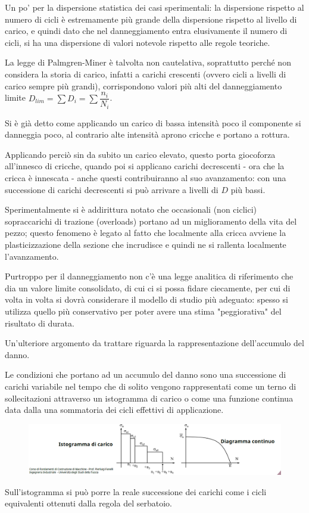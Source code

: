 			 Un po' per la dispersione statistica dei casi sperimentali: la dispersione rispetto al numero di cicli è estremamente più grande della dispersione rispetto al livello di carico, e quindi dato che nel danneggiamento entra elusivamente il numero di cicli, si ha una dispersione di valori notevole rispetto alle regole teoriche. 
			 
			 La legge di Palmgren-Miner è talvolta non cautelativa, soprattutto perché non considera la storia di carico, infatti a carichi crescenti (ovvero cicli a livelli di carico sempre più grandi), corrispondono valori più alti del danneggiamento limite $D_{lim} = \sum D_i = \sum \dfrac{n_i}{N_i}$. \newpage
			 
			 Si è già detto come applicando un carico di bassa intensità poco il componente si danneggia poco, al contrario alte intensità aprono cricche e portano a rottura. 
			 
			 Applicando perciò sin da subito un carico elevato, questo porta giocoforza all'innesco di cricche, quando poi si applicano carichi decrescenti - ora che la cricca è innescata -  anche questi contribuiranno al suo avanzamento: con una successione di carichi decrescenti si può arrivare a livelli di $D$ più bassi. 
			 
			 Sperimentalmente si è addirittura notato che occasionali (non ciclici) sopraccarichi di trazione (overloads) portano ad un miglioramento della vita del pezzo; questo fenomeno è legato al fatto che localmente alla cricca avviene la plasticizzazione della sezione che incrudisce e quindi ne si rallenta localmente l'avanzamento. \newline
			 
			 Purtroppo per il danneggiamento non c'è una legge analitica di riferimento che dia un valore limite consolidato, di cui ci si possa fidare ciecamente, per cui di volta in volta si dovrà considerare il modello di studio più adeguato: spesso si utilizza quello più conservativo per poter avere una stima "peggiorativa" del risultato di durata. \newline 
			  
			 Un'ulteriore argomento da trattare riguarda la rappresentazione dell'accumulo del danno. 
			 
			 Le condizioni che portano ad un accumulo del danno sono una successione di carichi variabile nel tempo che di solito vengono rappresentati come un terno di sollecitazioni attraverso un istogramma di carico o come una funzione continua data dalla una sommatoria dei cicli effettivi di applicazione.
			 \begin{figure}[H]
			 	\centering
			 	\includegraphics[width=\linewidth]{immagini_10/screenshot032}
			 	\label{fig:screenshot032}
			 \end{figure}		 
				Sull'istogramma si può porre la reale successione dei carichi come i cicli equivalenti ottenuti dalla regola del serbatoio. \newline
				
